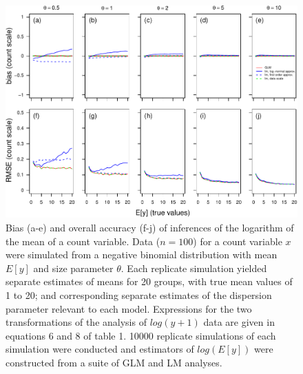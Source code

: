 \documentclass[]{article}
\begin{document}
\begin{figure}[h]

{\centering \includegraphics{revisiting_count_data_advice_files/figure-latex/SupplementAbsoluteScaleSeparateModels-1} 

}

\caption{Bias (a-e) and overall accuracy (f-j) of inferences of the logarithm of the mean of a count variable.  Data ($n=100$) for a count variable $x$ were simulated from a negative binomial distribution with mean $E[y]$ and size parameter $\theta$.   Each replicate simulation yielded separate estimates of means for 20 groups, with true mean values of 1 to 20; and corresponding separate estimates of the dispersion parameter relevant to each model.  Expressions for the two transformations of the analysis of $log(y+1)$ data are given in equations 6 and 8 of table 1. 10000 replicate simulations of each simulation were conducted and estimators of $log(E[y])$ were constructed from a suite of GLM and LM analyses.}\label{fig:SupplementAbsoluteScaleSeparateModels}
\end{figure}
\end{document}
